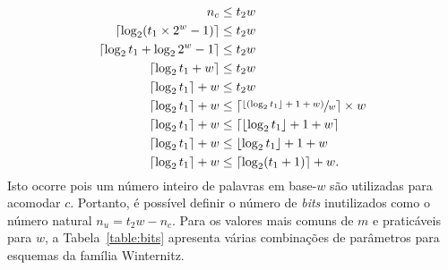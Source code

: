 \documentclass{ufsctex/ufsctex}
\begin{document}
\begin{align}
  \begin{split}
    n_c &\leq t_2 w \\
    \lceil \log_2 (t_1 \times 2^w - 1) \rceil &\leq t_2w \\
    \lceil \log_2 t_1 + \log_2 2^w - 1 \rceil &\leq t_2w \\
    \lceil \log_2 t_1 + w \rceil &\leq t_2w \\
    \lceil \log_2 t_1 \rceil + w &\leq t_2w \\
    \lceil \log_2 t_1 \rceil + w &\leq \left\lceil
      \sfrac{\lfloor (\log_2 t_1 \rfloor + 1 + w)}{w} \right\rceil \times w \\
    \lceil \log_2 t_1 \rceil + w
      &\leq \lceil \lfloor \log_2 t_1 \rfloor + 1 + w \rceil \\
    \lceil \log_2 t_1 \rceil + w &\leq \lfloor \log_2 t_1 \rfloor + 1 + w \\
    \lceil \log_2 t_1 \rceil + w &\leq \lceil \log_2 (t_1 + 1) \rceil + w.
  \end{split}
\end{align}
Isto ocorre pois um número inteiro de palavras em base-$w$ são utilizadas para
acomodar $c$. Portanto, é possível definir o número de \emph{bits} inutilizados
como o número natural $n_u = t_2w - n_c$. Para os valores mais comuns de $m$ e
praticáveis para $w$, a Tabela~\ref{table:bits} apresenta várias combinações de
parâmetros para esquemas da família Winternitz.
\end{document}
